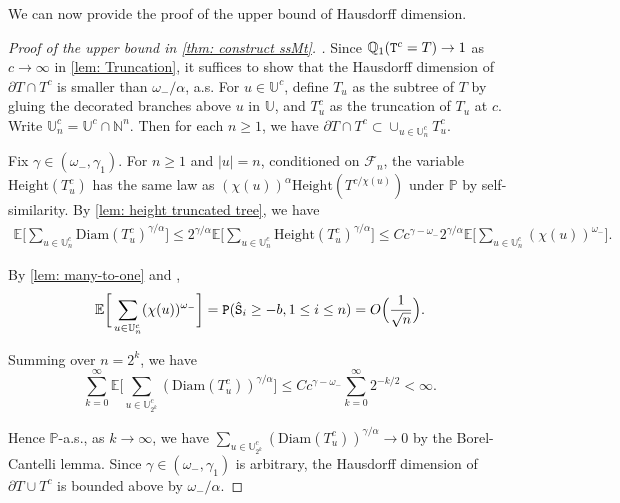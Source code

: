 \documentclass[12pt]{article}
\numberwithin{equation}{section}
\theoremstyle{plain}
\theoremstyle{definition}
\begin{document}
We can now provide the proof of the upper bound of Hausdorff dimension.

\begin{proof}[Proof of the upper bound in \cref{thm: construct ssMt}. ]
Since $\mathbb{Q}_1({\tt T}^c = T) \to 1$ as $c\to \infty$ in \cref{lem: Truncation}, it suffices to show that the Hausdorff dimension of $\partial T\cap T^c$ is smaller than $\omega_-/\alpha$, a.s. For $u\in \mathbb{U}^c$, define $T_u$ as the subtree of $T$ by gluing the decorated branches above $u$ in $\mathbb{U}$, and $T_u^c$ as the truncation of $T_u$ at $c$. Write $\mathbb{U}^c_n = \mathbb{U}^c\cap \mathbb{N}^n$. Then for each $n\geq 1$, we have $\partial T\cap T^c\subset \cup_{u\in\mathbb{U}^c_n} T^c_u$.

Fix $\gamma \in(\omega_-, \gamma_1)$. For $n\geq 1$ and $|u| = n$, conditioned on $\mathcal{F}_n$, the variable  $\mathrm{Height}(T^c_u)$ has the same law as $(\chi(u))^{\alpha}\mathrm{Height}(T^{c/\chi(u)})$ under $\mathbb{P}$ by self-similarity. By \cref{lem: height truncated tree}, we have
\begin{align*}
\mathbb{E}\bigg[\sum_{u\in\mathbb{U}^c_n} \mathrm{Diam}(T^c_u)^{\gamma/\alpha}\bigg]\leq 2^{\gamma/\alpha}\mathbb{E}\bigg[\sum_{u\in\mathbb{U}^c_n} \mathrm{Height}(T^c_u)^{\gamma/\alpha}\bigg]\leq Cc^{\gamma-\omega_-}2^{\gamma/\alpha}\mathbb{E}\bigg[\sum_{u\in\mathbb{U}^c_n} (\chi(u))^{\omega_-}\bigg].
\end{align*}

\noindent By \cref{lem: many-to-one} and \cite[equation (A.7)]{ShiZhan2016BRWE},
\[\mathbb{E}\bigg[\sum_{u\in\mathbb{U}^c_n} (\chi(u))^{\omega_-}\bigg] = {\tt P}({\hat{\tt S}}_i\geq -b, 1\leq i\leq n) = O\Big(\frac{1}{\sqrt{n}}\Big). \]

\noindent Summing over $n = 2^k$, we have
\[\sum^{\infty}_{k=0} \mathbb{E}\bigg[\sum_{u\in\mathbb{U}^c_{2^k}} (\mathrm{Diam}(T^c_u))^{\gamma/\alpha}\bigg]\leq Cc^{\gamma-\omega_-}\sum^{\infty}_{k=0} 2^{-k/2}<\infty. \]

\noindent Hence $\mathbb{P}$-a.s., as $k\to\infty$, we have $\sum_{u\in\mathbb{U}^c_{2^k}} (\mathrm{Diam}(T^c_u))^{\gamma/\alpha}\to 0$ by the Borel-Cantelli lemma. Since $\gamma\in(\omega_-, \gamma_1)$ is arbitrary, the Hausdorff dimension of $\partial T \cup T^c$ is bounded  above by $\omega_-/\alpha$. \end{proof}




\end{document}
